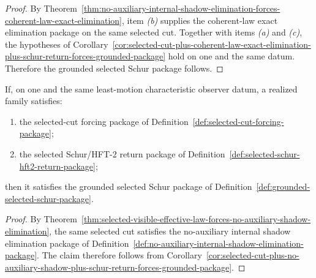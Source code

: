 \begin{proof}
By
Theorem~\ref{thm:no-auxiliary-internal-shadow-elimination-forces-coherent-law-exact-elimination},
item \emph{(b)} supplies the coherent-law exact elimination package on the same
selected cut. Together with items \emph{(a)} and \emph{(c)}, the hypotheses of
Corollary~\ref{cor:selected-cut-plus-coherent-law-exact-elimination-plus-schur-return-forces-grounded-package}
hold on one and the same datum. Therefore the grounded selected Schur package
follows.
\end{proof}

\begin{corollary}
\label{cor:selected-cut-plus-schur-return-forces-grounded-package}
If, on one and the same least-motion characteristic observer datum, a realized
family satisfies:
\begin{enumerate}[label=(\alph*), leftmargin=2em, itemsep=0.2em]
\item the selected-cut forcing package of
      Definition~\ref{def:selected-cut-forcing-package};
\item the selected Schur/HFT-2 return package of
      Definition~\ref{def:selected-schur-hft2-return-package};
\end{enumerate}
then it satisfies the grounded selected Schur package of
Definition~\ref{def:grounded-selected-schur-package}.
\end{corollary}

\begin{proof}
By
Theorem~\ref{thm:selected-visible-effective-law-forces-no-auxiliary-shadow-elimination},
the same selected cut satisfies the no-auxiliary internal shadow elimination
package of
Definition~\ref{def:no-auxiliary-internal-shadow-elimination-package}. The
claim therefore follows from
Corollary~\ref{cor:selected-cut-plus-no-auxiliary-shadow-plus-schur-return-forces-grounded-package}.
\end{proof}

